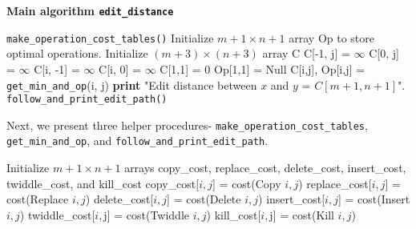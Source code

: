 \documentclass[paper=a4, fontsize=11pt]{scrartcl} %
\numberwithin{equation}{section} %
\numberwithin{figure}{section} %
\numberwithin{table}{section} %
\begin{document}
\textbf{Main algorithm \texttt{edit\_distance}}\\

\begin{algorithmic}
\State \texttt{make\_operation\_cost\_tables()}
\State Initialize $m + 1 \times n + 1$ array Op to store optimal operations.
\State Initialize $(m + 3) \times (n + 3)$ array C 
	\State C[-1, j] = $\infty$
	\State C[0, j] = $\infty$
\EndFor
{}
	\State C[i, -1] = $\infty$
	\State C[i, 0] = $\infty$
\EndFor
\State C[1,1] = 0
\State Op[1,1] = Null
 
			\State C[i,j],  Op[i,j] = \texttt{get\_min\_and\_op}(i, j)
		\EndIf
	\EndFor
\EndFor
\State \textbf{print} "Edit distance between $x$ and $y$ = $C[m + 1, n + 1]$".
\State \texttt{follow\_and\_print\_edit\_path()}
\EndFunction
\end{algorithmic}

Next, we present three helper procedures- \texttt{make\_operation\_cost\_tables}, \texttt{get\_min\_and\_op}, and \texttt{follow\_and\_print\_edit\_path}.\\

\begin{algorithmic}
\State Initialize $m + 1 \times n + 1$ arrays copy\_cost, replace\_cost, delete\_cost, insert\_cost, twiddle\_cost, and kill\_cost 
		\State copy\_cost[$i,j$] = cost(Copy $i,j$)
		\State replace\_cost[$i,j$] = cost(Replace $i,j$)
		\State delete\_cost[$i,j$] = cost(Delete $i,j$)
		\State insert\_cost[$i,j$] = cost(Insert $i,j$)
		\State twiddle\_cost[$i,$j] = cost(Twiddle $i,j$)
		\State kill\_cost[$i,$j] = cost(Kill $i,j$)
	\EndFor
\EndFor
\EndFunction
\end{algorithmic}
\end{document}
